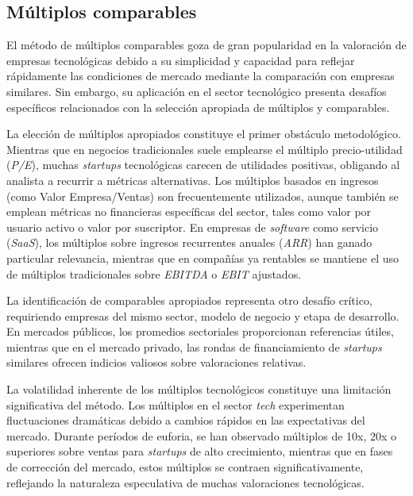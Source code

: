 \subsection{Múltiplos comparables}

El método de múltiplos comparables goza de gran popularidad en la valoración de empresas tecnológicas debido a su simplicidad y capacidad para reflejar rápidamente las condiciones de mercado mediante la comparación con empresas similares. Sin embargo, su aplicación en el sector tecnológico presenta desafíos específicos relacionados con la selección apropiada de múltiplos y comparables.

La elección de múltiplos apropiados constituye el primer obstáculo metodológico. Mientras que en negocios tradicionales suele emplearse el múltiplo precio-utilidad (\emph{P/E}), muchas \emph{startups} tecnológicas carecen de utilidades positivas, obligando al analista a recurrir a métricas alternativas. Los múltiplos basados en ingresos (como Valor Empresa/Ventas) son frecuentemente utilizados, aunque también se emplean métricas no financieras específicas del sector, tales como valor por usuario activo o valor por suscriptor. En empresas de \emph{software} como servicio (\emph{SaaS}), los múltiplos sobre ingresos recurrentes anuales (\emph{ARR}) han ganado particular relevancia, mientras que en compañías ya rentables se mantiene el uso de múltiplos tradicionales sobre \emph{EBITDA} o \emph{EBIT} ajustados.

La identificación de comparables apropiados representa otro desafío crítico, requiriendo empresas del mismo sector, modelo de negocio y etapa de desarrollo. En mercados públicos, los promedios sectoriales proporcionan referencias útiles, mientras que en el mercado privado, las rondas de financiamiento de \emph{startups} similares ofrecen indicios valiosos sobre valoraciones relativas.

La volatilidad inherente de los múltiplos tecnológicos constituye una limitación significativa del método. Los múltiplos en el sector \emph{tech} experimentan fluctuaciones dramáticas debido a cambios rápidos en las expectativas del mercado. Durante períodos de euforia, se han observado múltiplos de 10x, 20x o superiores sobre ventas para \emph{startups} de alto crecimiento, mientras que en fases de corrección del mercado, estos múltiplos se contraen significativamente, reflejando la naturaleza especulativa de muchas valoraciones tecnológicas.

